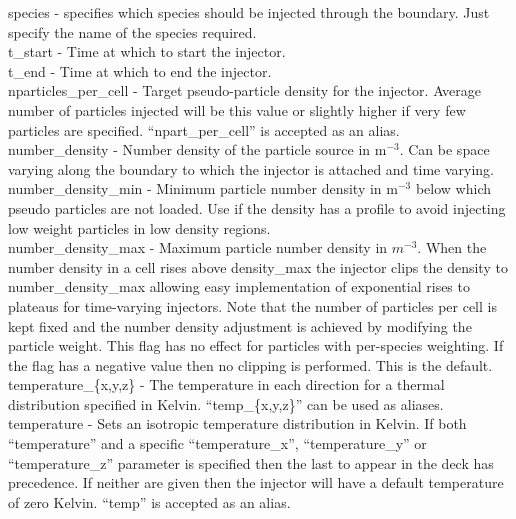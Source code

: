{\emphtext species} - specifies which species should be injected through the
  boundary. Just specify the name of the species required.\\

{\emphtext t\_start} - Time at which to start the injector.\\

{\emphtext t\_end} - Time at which to end the injector.\\

{\emphtext nparticles\_per\_cell} - Target pseudo-particle density for the
  injector. Average number of particles injected will be this value or slightly
  higher if very few particles are specified. ``npart\_per\_cell'' is accepted
  as an alias.\\

{\emphtext number\_density} - Number density of the particle source in
  m$^{-3}$. Can be space varying along the boundary to which the injector is
  attached and time varying.\\

{\emphtext number\_density\_min} - Minimum particle number density in m$^{-3}$
  below which pseudo particles are not loaded. Use if the density has a profile
  to avoid injecting low weight particles in low density regions.\\

{\emphtext number\_density\_max} - Maximum particle number density in $m^{-3}$.
  When the number density in a cell rises above density\_max the
  injector clips the density to number\_density\_max allowing easy
  implementation of exponential rises to plateaus for time-varying injectors.
  Note that the number of particles per cell is kept fixed and the number
  density adjustment is achieved by modifying the particle weight. This flag
  has no effect for particles with per-species weighting.
  If the flag has a negative value then no clipping is performed. This is the
  default.\\

{\emphtext temperature\_\{x,y,z\}} - The temperature in each direction for a
  thermal distribution specified in Kelvin. ``temp\_\{x,y,z\}'' can be used as
  aliases.\\

{\emphtext temperature} - Sets an isotropic temperature distribution in Kelvin.
  If both ``temperature'' and a specific ``temperature\_x'', ``temperature\_y''
  or ``temperature\_z'' parameter is specified then the last to appear in the
  deck has precedence. If neither are given then the injector will have a
  default temperature of zero Kelvin. ``temp'' is accepted as an alias.\\


